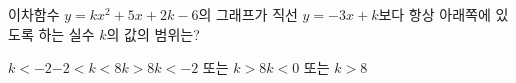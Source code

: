 이차함수 $y=kx^2+5x+2k-6$의 그래프가 직선 $y=-3x+k$보다 항상 아래쪽에 있도록 하는 실수 $k$의 값의 범위는?
\begin{choicesii}{$k<-2$}{$-2<k<8$}{$k>8$}{$k<-2$ 또는 $k>8$}{$k<0$ 또는 $k>8$}\end{choicesii}
